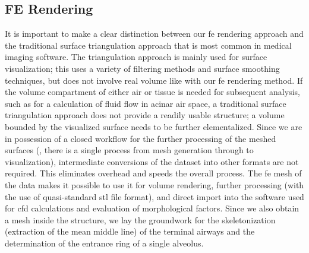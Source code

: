 \subsection{FE \threed Rendering}
It is important to make a clear distinction between our \ac{fe} \threed rendering approach and the traditional surface triangulation approach that is most common in medical imaging software. The triangulation approach is mainly used for surface visualization; this uses a variety of filtering methods and surface smoothing techniques, but does not involve real volume like with our \ac{fe} \threed rendering method. If the volume compartment of either air or tissue is needed for subsequent analysis, such as for a calculation of fluid flow in acinar air space, a traditional surface triangulation approach does not provide a readily usable \threed structure; a volume bounded by the visualized surface needs to be further elementalized. Since we are in possession of a closed workflow for the further processing of the meshed surfaces (\ie, there is a single process from mesh generation through to visualization), intermediate conversions of the dataset into other formats are not required. This eliminates overhead and speeds the overall process. The \ac{fe} mesh of the data makes it possible to use it for volume rendering, further processing (with the use of quasi-standard \acs{stl} file format), and direct import into the software used for \ac{cfd} calculations and evaluation of morphological factors. Since we also obtain a mesh inside the structure, we lay the groundwork for the skeletonization (extraction of the mean middle line) of the terminal airways and the determination of the entrance ring of a single alveolus.

